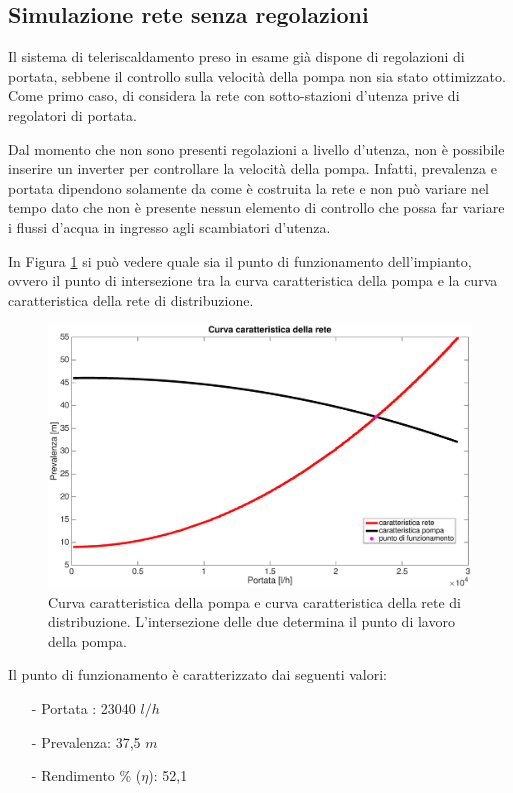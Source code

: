 \documentclass[laurea,oneside,11pt]{USiena_tesiLM3}
\begin{document}
\subsection{Simulazione rete senza regolazioni}
Il sistema di teleriscaldamento preso in esame già dispone di regolazioni di portata, sebbene il controllo sulla velocità della pompa non sia stato ottimizzato. Come primo caso, di considera la  rete con sotto-stazioni d'utenza prive di regolatori di portata.

Dal momento che non sono presenti regolazioni a livello d'utenza, non è possibile inserire un inverter per controllare la velocità  della pompa. Infatti, prevalenza e portata dipendono solamente da come è costruita la rete e non può variare nel tempo dato che non è presente nessun elemento di controllo che possa far variare i flussi d'acqua in ingresso agli scambiatori d'utenza.

In Figura \ref{fig:sim1_noreg} si può vedere quale sia il punto di funzionamento dell'impianto, ovvero il punto di intersezione tra la curva caratteristica della pompa e la curva caratteristica della rete di distribuzione.

\begin{figure}[!ht]
\centering
\includegraphics[width=\textwidth]{figure/sim1_noreg} 
\caption{Curva caratteristica della pompa e curva caratteristica della rete di distribuzione. L'intersezione delle due determina il punto di lavoro della pompa. }
\label{fig:sim1_noreg}
\end{figure}

Il punto di funzionamento è caratterizzato dai seguenti valori:
\begin{itemize}
\item[-] Portata : 23040 $l/h$
\item[-] Prevalenza: 37,5 $m$
\item[-] Rendimento \% ($\eta$): 52,1%
\end{itemize}
\end{document}
